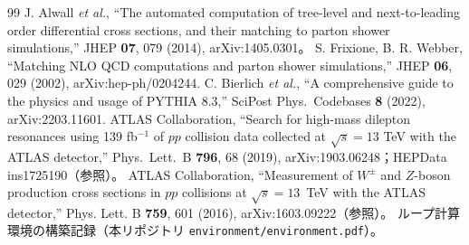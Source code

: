 \documentclass[a4paper,10pt]{ltjsarticle}
\begin{document}
\begin{thebibliography}{99}
 J. Alwall \textit{et al.}, ``The automated computation of tree-level and next-to-leading order differential cross sections, and their matching to parton shower simulations,'' JHEP \textbf{07}, 079 (2014), arXiv:1405.0301。
 S. Frixione, B. R. Webber, ``Matching NLO QCD computations and parton shower simulations,'' JHEP \textbf{06}, 029 (2002), arXiv:hep-ph/0204244.
 C. Bierlich \textit{et al.}, ``A comprehensive guide to the physics and usage of PYTHIA 8.3,'' SciPost Phys.\ Codebases \textbf{8} (2022), arXiv:2203.11601.
 ATLAS Collaboration, ``Search for high-mass dilepton resonances using 139 fb$^{-1}$ of $pp$ collision data collected at $\sqrt s=13$ TeV with the ATLAS detector,'' Phys.\ Lett.\ B \textbf{796}, 68 (2019), arXiv:1903.06248；HEPData ins1725190（参照）。
 ATLAS Collaboration, ``Measurement of $W^\pm$ and $Z$-boson production cross sections in $pp$ collisions at $\sqrt s=13$~TeV with the ATLAS detector,'' Phys. Lett. B \textbf{759}, 601 (2016), arXiv:1603.09222（参照）。
 ループ計算環境の構築記録（本リポジトリ \nolinkurl{environment/environment.pdf}）。
\end{thebibliography}
\end{document}
